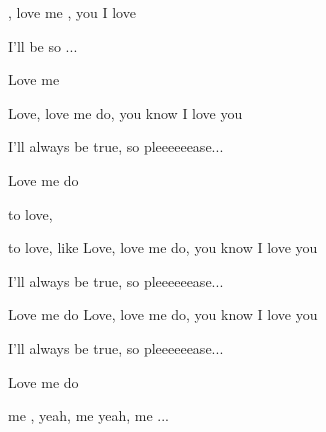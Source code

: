 
\zs

, love me ,
you  I love 

I'll  be 
so ...

Love me 
\ks

\zs
Love, love me do,
you know I love you

I'll always be true,
so pleeeeeease...

Love me do
\ks
\zr

 to love,  

 to love,  like 
\kr
\zs
Love, love me do,
you know I love you

I'll always be true,
so pleeeeeease...

Love me do
\ks
\zs
Love, love me do,
you know I love you

I'll always be true,
so pleeeeeease...

Love me do
\ks


 me , yeah,  me 
yeah,  me ...

\kp





